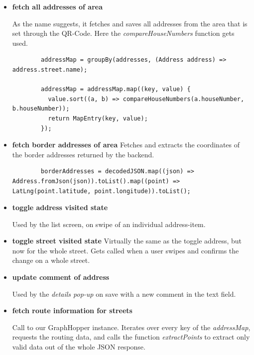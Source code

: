 \begin{itemize}
    \item \textbf{fetch all addresses of area}
    
    As the name suggests, it fetches and saves all addresses from the area that is set through the QR-Code. Here the \textit{compareHouseNumbers} function gets used.

    \lstset{style=dart, caption=use of compareHouseNumbers function (AddressProvider.dart)}
    \begin{verbatim}
        addressMap = groupBy(addresses, (Address address) => address.street.name);

        addressMap = addressMap.map((key, value) {
          value.sort((a, b) => compareHouseNumbers(a.houseNumber, b.houseNumber));
          return MapEntry(key, value);
        });
    \end{verbatim}

    \item \textbf{fetch border addresses of area}
    Fetches and extracts the coordinates of the border addresses returned by the backend.

    \lstset{style=generic, caption=extraction of coordinates from border addresses (AddressProvider.dart)}
    \begin{verbatim}
        borderAddresses = decodedJSON.map((json) => Address.fromJson(json)).toList().map((point) => LatLng(point.latitude, point.longitude)).toList();
    \end{verbatim}

    \item \textbf{toggle address visited state}
    
    Used by the list screen, on swipe of an individual address-item.

    \item \textbf{toggle street visited state}
    Virtually the same as the toggle address, but now for the whole street. Gets called when a user swipes and confirms the change on a whole street.

    \item \textbf{update comment of address}
    
    Used by the \textit{details pop-up} on save with a new comment in the text field.

    \item \textbf{fetch route information for streets}
    
    Call to our GraphHopper instance. Iterates over every key of the \textit{addressMap}, requests the routing data, and calls the function \textit{extractPoints} to extract only valid data out of the whole JSON response.
\end{itemize}

